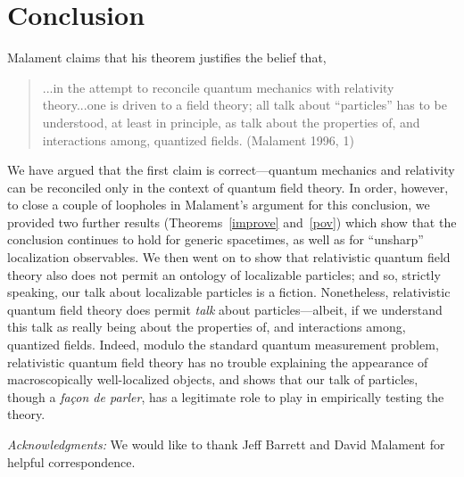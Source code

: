\documentclass[11pt]{article}
\theoremstyle{remark}
\begin{document}
\section{Conclusion}
Malament claims that his theorem justifies the belief that,
\begin{quote}
  ...in the attempt to reconcile quantum mechanics with relativity
  theory...one is driven to a field theory; all talk about
  ``particles'' has to be understood, at least in principle, as talk
  about the properties of, and interactions among, quantized fields.
  (Malament 1996, 1) \end{quote} We have argued that the first claim
is correct---quantum mechanics and relativity can be reconciled only
in the context of quantum field theory.  In order, however, to close a
couple of loopholes in Malament's argument for this conclusion, we
provided two further results (Theorems~\ref{improve} and~\ref{pov})
which show that the conclusion continues to hold for generic
spacetimes, as well as for ``unsharp'' localization observables.  We
then went on to show that relativistic quantum field theory also does
not permit an ontology of localizable particles; and so, strictly
speaking, our talk about localizable particles is a fiction.
Nonetheless, relativistic quantum field theory does permit \emph{talk}
about particles---albeit, if we understand this talk as really being
about the properties of, and interactions among, quantized fields.
Indeed, modulo the standard quantum measurement problem, relativistic
quantum field theory has no trouble explaining the appearance of
macroscopically well-localized objects, and shows that our talk of
particles, though a \emph{fa{\c{c}}on de parler}, has a legitimate
role to play in empirically testing the theory.

\vspace{1em} {\it Acknowledgments:} We would like to thank Jeff
Barrett and David Malament for helpful correspondence.
\end{document}
